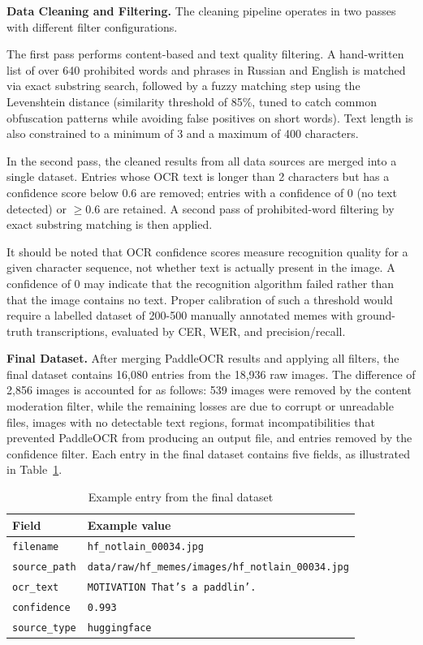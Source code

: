 \documentclass[a4paper,12pt]{article}
\begin{document}
\textbf{Data Cleaning and Filtering.} The cleaning pipeline operates in two passes with different filter configurations.

The first pass performs content-based and text quality filtering. A hand-written list of over 640 prohibited words and phrases in Russian and English is matched via exact substring search, followed by a fuzzy matching step using the Levenshtein distance (similarity threshold of 85\%, tuned to catch common obfuscation patterns while avoiding false positives on short words). Text length is also constrained to a minimum of 3 and a maximum of 400 characters.

In the second pass, the cleaned results from all data sources are merged into a single dataset. Entries whose OCR text is longer than 2 characters but has a confidence score below 0.6 are removed; entries with a confidence of 0 (no text detected) or $\geq 0.6$ are retained. A second pass of prohibited-word filtering by exact substring matching is then applied.

It should be noted that OCR confidence scores measure recognition quality for a given character sequence, not whether text is actually present in the image. A confidence of 0 may indicate that the recognition algorithm failed rather than that the image contains no text. Proper calibration of such a threshold would require a labelled dataset of 200-500 manually annotated memes with ground-truth transcriptions, evaluated by CER, WER, and precision/recall.

\textbf{Final Dataset.} After merging PaddleOCR results and applying all filters, the final dataset contains 16,080 entries from the 18,936 raw images. The difference of 2,856 images is accounted for as follows: 539 images were removed by the content moderation filter, while the remaining losses are due to corrupt or unreadable files, images with no detectable text regions, format incompatibilities that prevented PaddleOCR from producing an output file, and entries removed by the confidence filter. Each entry in the final dataset contains five fields, as illustrated in Table~\ref{tab:csv_example}.

\begin{table}[H]
\centering
\caption{Example entry from the final dataset}
\label{tab:csv_example}
\small
\begin{tabular}{|l|l|}
\hline
\textbf{Field} & \textbf{Example value} \\
\hline
\texttt{filename} & \texttt{hf\_notlain\_00034.jpg} \\
\hline
\texttt{source\_path} & \texttt{data/raw/hf\_memes/images/hf\_notlain\_00034.jpg} \\
\hline
\texttt{ocr\_text} & \texttt{MOTIVATION That's a paddlin'.} \\
\hline
\texttt{confidence} & \texttt{0.993} \\
\hline
\texttt{source\_type} & \texttt{huggingface} \\
\hline
\end{tabular}
\end{table}
\end{document}
